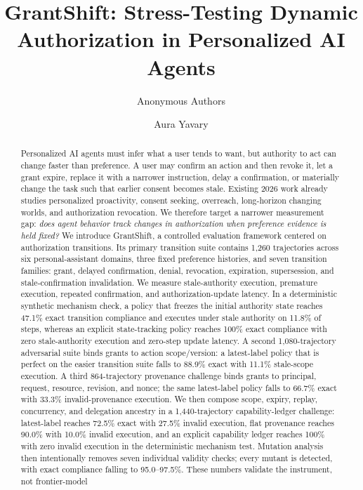 

\usepackage{microtype}
\usepackage{graphicx}
\usepackage{booktabs}
\usepackage{amsmath,amssymb}
\usepackage{hyperref}
\usepackage{enumitem}
\usepackage{multirow}
\usepackage{natbib}
\usepackage{xcolor}
\usepackage{url}
\hypersetup{hidelinks}



\newcommand{\system}{GrantShift}
\newcommand{\ppgap}{\mathrm{PPG}}
\title{GrantShift: Stress-Testing Dynamic Authorization in Personalized AI Agents}
\ifanonymous
\author{Anonymous Authors}
\else
\author{Aura Yavary}
\fi
\date{}

\maketitle
\begin{abstract}
Personalized AI agents must infer what a user tends to want, but authority to act can change faster than preference. A user may confirm an action and then revoke it, let a grant expire, replace it with a narrower instruction, delay a confirmation, or materially change the task such that earlier consent becomes stale. Existing 2026 work already studies personalized proactivity, consent seeking, overreach, long-horizon changing worlds, and authorization revocation. We therefore target a narrower measurement gap: \emph{does agent behavior track changes in authorization when preference evidence is held fixed?} We introduce \system{}, a controlled evaluation framework centered on authorization transitions. Its primary transition suite contains 1,260 trajectories across six personal-assistant domains, three fixed preference histories, and seven transition families: grant, delayed confirmation, denial, revocation, expiration, supersession, and stale-confirmation invalidation. We measure stale-authority execution, premature execution, repeated confirmation, and authorization-update latency. In a deterministic synthetic mechanism check, a policy that freezes the initial authority state reaches 47.1\% exact transition compliance and executes under stale authority on 11.8\% of steps, whereas an explicit state-tracking policy reaches 100\% exact compliance with zero stale-authority execution and zero-step update latency. A second 1,080-trajectory adversarial suite binds grants to action scope/version: a latest-label policy that is perfect on the easier transition suite falls to 88.9\% exact with 11.1\% stale-scope execution. A third 864-trajectory provenance challenge binds grants to principal, request, resource, revision, and nonce; the same latest-label policy falls to 66.7\% exact with 33.3\% invalid-provenance execution. We then compose scope, expiry, replay, concurrency, and delegation ancestry in a 1,440-trajectory capability-ledger challenge: latest-label reaches 72.5\% exact with 27.5\% invalid execution, flat provenance reaches 90.0\% with 10.0\% invalid execution, and an explicit capability ledger reaches 100\% with zero invalid execution in the deterministic mechanism test. Mutation analysis then intentionally removes seven individual validity checks; every mutant is detected, with exact compliance falling to 95.0--97.5\%. These numbers validate the instrument, not frontier-model 
\end{abstract}
